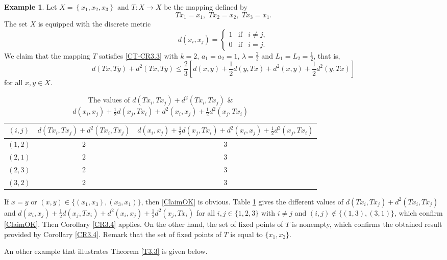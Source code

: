 \documentclass[letterpaper,12pt]{article}
\numberwithin{equation}{section}
\theoremstyle{definition}
\newtheorem{example}[theorem]{Example}
\theoremstyle{remark}
\begin{document}
\begin{example}\label{example-3.6}
Let $X=\left\{x_1,x_2,x_3\right\}$ and $T: X\to X$ be the mapping defined by 
$$
Tx_1=x_1,\,\, Tx_2=x_2,\,\, Tx_3=x_1.
$$
The set $X$ is equipped with the discrete metric 
$$
d(x_i,x_j)=\left\{\begin{array}{llll}
1 &\mbox{if}& i\neq j,\\[4pt]
0  &\mbox{if}& i=j. 	
\end{array}
\right.
$$
We claim that the mapping $T$ satisfies 	\eqref{CT-CR3.3} with $k=2$, $a_1=a_2=1$, $\lambda=\frac{2}{3}$ and $L_1=L_2=\frac{1}{2}$, that is,
\begin{equation}\label{ClaimOK}
d(Tx,Ty)+d^2(Tx,Ty)\leq \frac{2}{3}\left[d(x,y)+\frac{1}{2}d(y,Tx)+d^2(x,y)+\frac{1}{2}d^2(y,Tx)\right]
\end{equation}
for all $x,y\in X$. 
\begin{table}[htt!]
\begin{center}
\begin{tabular}{|c | c | c |}
  \hline			
  $(i,j)$ & $d(Tx_i,Tx_j)+d^2(Tx_i,Tx_j)$  & $d(x_i,x_j)+\frac{1}{2}d(x_j,Tx_i)+d^2(x_i,x_j)+\frac{1}{2}d^2(x_j,Tx_i)$ \\
  \hline
  $(1,2)$ & 2 & 3 \\
  \hline
  $(2,1)$ & 2 & 3 \\
  \hline 
   $(2,3)$ & 2 & 3 \\
  \hline 
  $(3,2)$ & 2 & 3 \\
  \hline 
\end{tabular}
\caption{The values of $d(Tx_i,Tx_j)+d^2(Tx_i,Tx_j)$ \& $d(x_i,x_j)+\frac{1}{2}d(x_j,Tx_i)+d^2(x_i,x_j)+\frac{1}{2}d^2(x_j,Tx_i)$}\label{Tb2}
\end{center}
\end{table} 
If $x=y$ or $(x,y)\in\{(x_1,x_3),(x_3,x_1)\}$,  then \eqref{ClaimOK} is obvious. Table \ref{Tb2} gives the different values of $d(Tx_i,Tx_j)+d^2(Tx_i,Tx_j)$ and $d(x_i,x_j)+\frac{1}{2}d(x_j,Tx_i)+d^2(x_i,x_j)+\frac{1}{2}d^2(x_j,Tx_i)$ for all $i,j\in\{1,2,3\}$ with $i\neq j$ and $(i,j)\not\in\{ (1,3),(3,1)\}$, which confirm \eqref{ClaimOK}.  Then Corollary \ref{CR3.4} applies. On the other hand, the set of fixed points of $T$ is nonempty, which confirms the obtained result provided by Corollary \ref{CR3.4}. Remark that the set of fixed points of $T$ is equal to $\{x_1,x_2\}$. 
\end{example}

An  other example that illustrates    Theorem \ref{T3.3} is   given below. 
\end{document}

